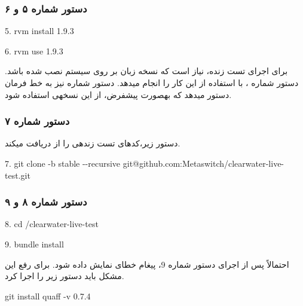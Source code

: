 \subsubsection{دستور شماره ۵ و ۶}
\begin{latin}
\setlength{\parindent}{0ex}
5. rvm install 1.9.3

6. rvm use 1.9.3
\end{latin}
برای اجرای تست زنده، نیاز است که نسخه  زبان  بر روی سیستم نصب شده باشد. دستور شماره ، با استفاده از  این کار را انجام می\nf دهد. دستور شماره  نیز به خط فرمان دستور می\nf دهد که به\nf صورت پیش\nf فرض، از این نسخه\nf ی  استفاده شود.



\subsubsection{دستور شماره ۷}
دستور زیر،کدهای تست زنده\nf ی  را از  دریافت می\nf کند.
\begin{latin}
\setlength{\parindent}{0ex}
7. git clone -b stable -\nf -recursive git@github.com:Metaswitch/clearwater-live-test.git
\end{latin}

\subsubsection{دستور شماره ۸ و ۹}
\begin{latin}
\setlength{\parindent}{0ex}
8. cd /clearwater-live-test

9. bundle install
\end{latin}
احتمالاً پس از اجرای دستور شماره 9، پیغام خطای  نمایش داده شود. برای رفع این مشکل باید دستور زیر را اجرا کرد.
\begin{latin}
\setlength{\parindent}{0ex}
git install quaff -v 0.7.4
\end{latin}